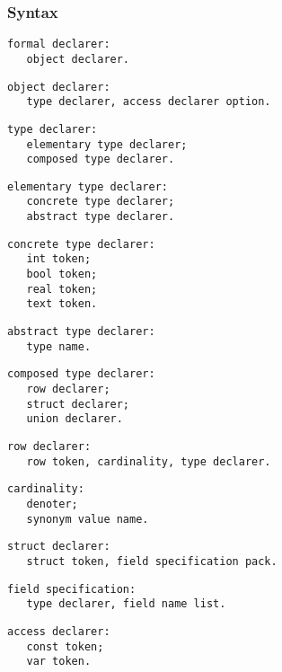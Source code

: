 \documentclass [a4paper,12pt,fleqn]{article}
\begin{document}
\subsubsection*{Syntax}
\begin{letterlist}
\item
\begin{verbatim}
formal declarer:
   object declarer.
\end{verbatim}
\item
\begin{verbatim}
object declarer:
   type declarer, access declarer option.
\end{verbatim}
\item
\begin{verbatim}
type declarer:
   elementary type declarer;
   composed type declarer.
\end{verbatim}
\item
\begin{verbatim}
elementary type declarer:
   concrete type declarer;
   abstract type declarer.
\end{verbatim}
\item
\begin{verbatim}
concrete type declarer:
   int token;
   bool token;
   real token;
   text token.
\end{verbatim}
\item
\begin{verbatim}
abstract type declarer:
   type name.
\end{verbatim}
\item
\begin{verbatim}
composed type declarer:
   row declarer;
   struct declarer;
   union declarer.
\end{verbatim}
\item
\begin{verbatim}
row declarer:
   row token, cardinality, type declarer.
\end{verbatim}
\item
\begin{verbatim}
cardinality:
   denoter;
   synonym value name.
\end{verbatim}
\item
\begin{verbatim}
struct declarer:
   struct token, field specification pack.
\end{verbatim}
\item
\begin{verbatim}
field specification:
   type declarer, field name list.
\end{verbatim}
\item
\begin{verbatim}
access declarer:
   const token;
   var token.
\end{verbatim}
\end{letterlist}
\end{document}
